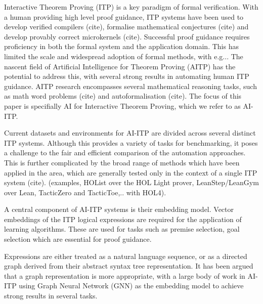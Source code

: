 \documentclass[letterpaper]{article} %
\begin{document}
    Interactive Theorem Proving (ITP) is a key paradigm of formal verification.
    With a human providing high level proof guidance, ITP systems have been used to develop verified compilers (cite), formalise mathematical conjectures (cite) and develop provably correct microkernels (cite).
    Successful proof guidance requires proficiency in both the formal system and the application domain.
    This has limited the scale and widespread adoption of formal methods, with e.g...
    The nascent field of Artificial Intelligence for Theorem Proving (AITP) has the potential to address this,
    with several strong results in automating human ITP guidance.
    AITP research encompasses several mathematical reasoning tasks, such as math word problems (cite) and autoformalisation (cite).
    The focus of this paper is specifially AI for Interactive Theorem Proving, which we refer to as AI-ITP.

    Current datasets and environments for AI-ITP are divided across several distinct ITP systems.
    Although this provides a variety of tasks for benchmarking,
    it poses a challenge to the fair and efficient comparison of the automation approaches.
    This is further complicated by the broad range of methods which have been applied in the area,
    which are generally tested only in the context of a single ITP system (cite).
    (examples, HOList over the HOL Light prover, LeanStep/LeanGym over Lean,
    TacticZero and TacticToe,.. with HOL4).


    A central component of AI-ITP systems is their embedding model.
    Vector embeddings of the ITP logical expressions are required for the application of learning algorithms.
    These are used for tasks such as premise selection, goal selection which are essential for proof guidance.

    Expressions are either treated as a natural language sequence, or as a directed graph derived from their abstract syntax tree
    representation. It has been argued that a graph representation is more appropriate, with a large body of work in AI-ITP
    using Graph Neural Network (GNN) as the embedding model to achieve strong results in several tasks.
\end{document}
